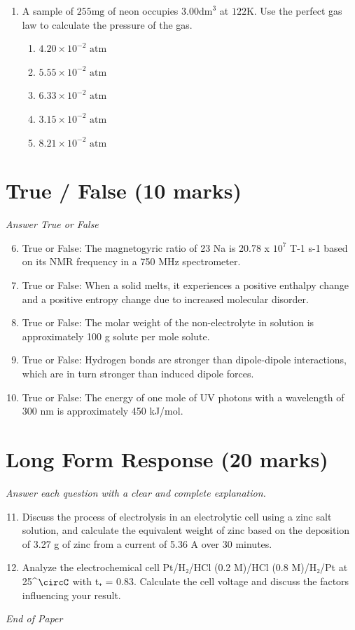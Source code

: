 \documentclass[12pt]{article}
\begin{document}
\begin{enumerate}[label=\arabic*.]
\begin{enumerate}[label=(\alph*)]
    \item 5.00 g O
    \item 3.10 g O
\end{enumerate}
\item A sample of $255 \mathrm{mg}$ of neon occupies $3.00 \mathrm{dm}^3$ at $122 \mathrm{K}$. Use the perfect gas law to calculate the pressure of the gas.
\begin{enumerate}[label=(\alph*)]
    \item $4.20 \times 10^{-2}$ $\text{atm}$
    \item $5.55 \times 10^{-2}$ $\text{atm}$
    \item $6.33 \times 10^{-2}$ $\text{atm}$
    \item $3.15 \times 10^{-2}$ $\text{atm}$
    \item $8.21 \times 10^{-2}$ $\text{atm}$
\end{enumerate}
\end{enumerate}

\section*{True / False (10 marks)}
\textit{Answer True or False}
\begin{enumerate}[label=\arabic*.]
\setcounter{enumi}{5}
\item True or False: The magnetogyric ratio of 23 Na is 20.78 x $10^7$ T-1 s-1 based on its NMR frequency in a 750 MHz spectrometer.
\item True or False: When a solid melts, it experiences a positive enthalpy change and a positive entropy change due to increased molecular disorder.
\item True or False: The molar weight of the non-electrolyte in solution is approximately 100 g solute per mole solute.
\item True or False: Hydrogen bonds are stronger than dipole-dipole interactions, which are in turn stronger than induced dipole forces.
\item True or False: The energy of one mole of UV photons with a wavelength of 300 nm is approximately 450 kJ/mol.
\end{enumerate}

\section*{Long Form Response (20 marks)}
\textit{Answer each question with a clear and complete explanation.}
\begin{enumerate}[label=\arabic*.]
\setcounter{enumi}{10}
\item Discuss the process of electrolysis in an electrolytic cell using a zinc salt solution, and calculate the equivalent weight of zinc based on the deposition of 3.27 g of zinc from a current of 5.36 A over 30 minutes.
\item Analyze the electrochemical cell Pt/H₂/HCl (0.2 M)/HCl (0.8 M)/H₂/Pt at 25^\ensuremath{\circC} with t₊ = 0.83. Calculate the cell voltage and discuss the factors influencing your result.
\end{enumerate}

\vfill
\noindent\textit{End of Paper}
\end{document}
